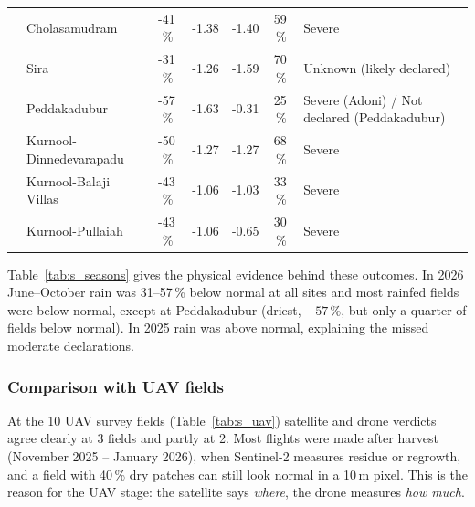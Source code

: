 \documentclass[11pt,a4paper,oneside]{article}
\begin{document}
\begin{table}[H]
{\begin{tabular}{@{}llccccl@{}}
 & Cholasamudram & -41\,\% & -1.38 & -1.40 & 59\,\% & Severe \\
 & Sira & -31\,\% & -1.26 & -1.59 & 70\,\% & Unknown (likely declared) \\
 & Peddakadubur & -57\,\% & -1.63 & -0.31 & 25\,\% & Severe (Adoni) / Not declared (Peddakadubur) \\
 & Kurnool-Dinnedevarapadu & -50\,\% & -1.27 & -1.27 & 68\,\% & Severe \\
 & Kurnool-Balaji Villas & -43\,\% & -1.06 & -1.03 & 33\,\% & Severe \\
 & Kurnool-Pullaiah & -43\,\% & -1.06 & -0.65 & 30\,\% & Severe \\
\bottomrule
\end{tabular}}
\end{table}


Table~\ref{tab:s_seasons} gives the physical evidence behind these outcomes. In 2026 June--October rain was 31--57\,\% below normal at all sites and most rainfed fields were below normal, except at Peddakadubur (driest, $-57$\,\%, but only a quarter of fields below normal). In 2025 rain was above normal, explaining the missed moderate declarations.

\subsubsection{Comparison with UAV fields}
At the 10 UAV survey fields (Table~\ref{tab:s_uav}) satellite and drone verdicts agree clearly at 3 fields and partly at 2. Most flights were made after harvest (November 2025 -- January 2026), when Sentinel-2 measures residue or regrowth, and a field with 40\,\% dry patches can still look normal in a 10\,m pixel. This is the reason for the UAV stage: the satellite says \emph{where}, the drone measures \emph{how much}.
\end{document}
